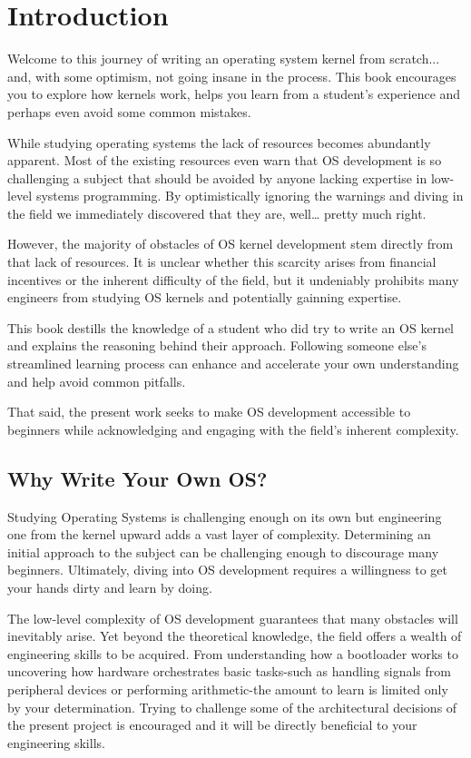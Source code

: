 \chapter{Introduction}

Welcome to this journey of writing an operating system kernel from scratch... and, with some optimism, not going insane in the 
process. This book encourages you to explore how kernels work, helps you learn from a student's experience and 
perhaps even avoid some common mistakes. 

While studying operating systems the lack of resources becomes abundantly apparent. Most of the existing resources even
warn that OS development is so challenging a subject that should be avoided by anyone lacking expertise
in low-level systems programming. By optimistically ignoring the warnings and diving in the field we immediately discovered
that they are, well… pretty much right.

However, the majority of obstacles of OS kernel development stem directly from that lack of resources.
It is unclear whether this scarcity arises from financial incentives or the inherent difficulty of the field, 
but it undeniably prohibits many engineers from studying OS kernels and potentially gainning expertise.

This book destills the knowledge of a student who did try to write an OS kernel and explains the reasoning behind their 
approach. Following someone else's streamlined learning process can enhance and accelerate your own understanding 
and help avoid common pitfalls.

That said, the present work seeks to make OS development accessible to beginners while acknowledging and engaging with the 
field's inherent complexity.

\section{Why Write Your Own OS?}

Studying Operating Systems is challenging enough on its own but engineering one from the kernel upward adds a vast layer of
complexity. Determining an initial approach to the subject can be challenging enough to discourage many beginners. 
Ultimately, diving into OS development requires a willingness to get your hands dirty and learn by doing.

The low-level complexity of OS development guarantees that many obstacles will inevitably arise. 
Yet beyond the theoretical knowledge, the field offers a wealth of engineering skills to be acquired. 
From understanding how a bootloader works to uncovering how hardware orchestrates basic tasks-such as handling 
signals from peripheral devices or performing arithmetic-the amount to learn is limited only by your determination. 
Trying to challenge some of the architectural decisions of the present project is encouraged and it will be directly
beneficial to your engineering skills.

